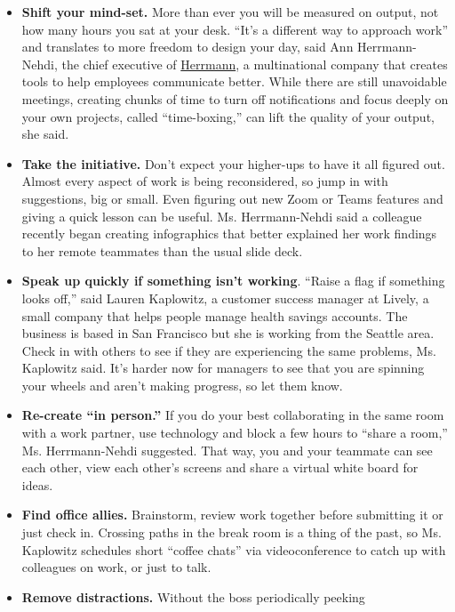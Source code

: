\begin{itemize}
\item
  \textbf{Shift your mind-set.} More than ever you will be measured on
  output, not how many hours you sat at your desk. ``It's a different
  way to approach work'' and translates to more freedom to design your
  day, said Ann Herrmann-Nehdi, the chief executive of
  \href{https://www.thinkherrmann.com/}{Herrmann}, a multinational
  company that creates tools to help employees communicate better. While
  there are still unavoidable meetings, creating chunks of time to turn
  off notifications and focus deeply on your own projects, called
  ``time-boxing,'' can lift the quality of your output, she said.
\item
  \textbf{Take the initiative.} Don't expect your higher-ups to have it
  all figured out. Almost every aspect of work is being reconsidered, so
  jump in with suggestions, big or small. Even figuring out new Zoom or
  Teams features and giving a quick lesson can be useful. Ms.
  Herrmann-Nehdi said a colleague recently began creating infographics
  that better explained her work findings to her remote teammates than
  the usual slide deck.
\item
  \textbf{Speak up quickly if something isn't working}. ``Raise a flag
  if something looks off,'' said Lauren Kaplowitz, a customer success
  manager at Lively, a small company that helps people manage health
  savings accounts. The business is based in San Francisco but she is
  working from the Seattle area. Check in with others to see if they are
  experiencing the same problems, Ms. Kaplowitz said. It's harder now
  for managers to see that you are spinning your wheels and aren't
  making progress, so let them know.
\item
  \textbf{Re-create ``in person.''} If you do your best collaborating in
  the same room with a work partner, use technology and block a few
  hours to ``share a room,'' Ms. Herrmann-Nehdi suggested. That way, you
  and your teammate can see each other, view each other's screens and
  share a virtual white board for ideas.
\item
  \textbf{Find office allies.} Brainstorm, review work together before
  submitting it or just check in. Crossing paths in the break room is a
  thing of the past, so Ms. Kaplowitz schedules short ``coffee chats''
  via videoconference to catch up with colleagues on work, or just to
  talk.
\item
  \textbf{Remove distractions.} Without the boss periodically peeking

\end{itemize}
